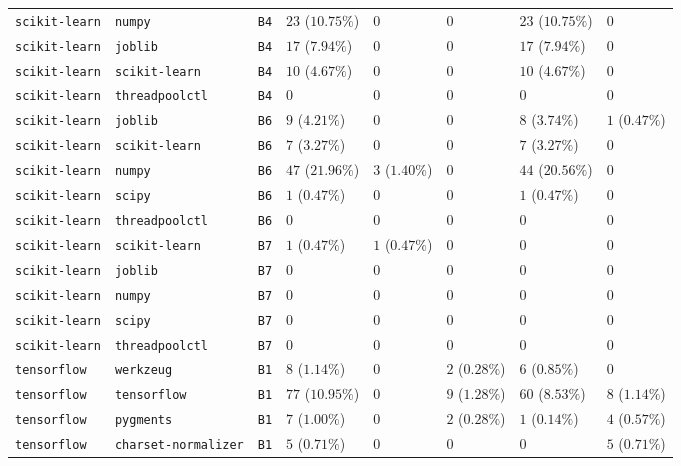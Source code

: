 \begin{table}
\begin{tabular}{llllllll}
\texttt{scikit-learn} & \texttt{numpy} & \texttt{B4} & $23$ ($10.75\%$) & $0$ & $0$ & $23$ ($10.75\%$) & $0$ \\
\texttt{scikit-learn} & \texttt{joblib} & \texttt{B4} & $17$ ($7.94\%$) & $0$ & $0$ & $17$ ($7.94\%$) & $0$ \\
\texttt{scikit-learn} & \texttt{scikit-learn} & \texttt{B4} & $10$ ($4.67\%$) & $0$ & $0$ & $10$ ($4.67\%$) & $0$ \\
\texttt{scikit-learn} & \texttt{threadpoolctl} & \texttt{B4} & $0$ & $0$ & $0$ & $0$ & $0$ \\
\texttt{scikit-learn} & \texttt{joblib} & \texttt{B6} & $9$ ($4.21\%$) & $0$ & $0$ & $8$ ($3.74\%$) & $1$ ($0.47\%$) \\
\texttt{scikit-learn} & \texttt{scikit-learn} & \texttt{B6} & $7$ ($3.27\%$) & $0$ & $0$ & $7$ ($3.27\%$) & $0$ \\
\texttt{scikit-learn} & \texttt{numpy} & \texttt{B6} & $47$ ($21.96\%$) & $3$ ($1.40\%$) & $0$ & $44$ ($20.56\%$) & $0$ \\
\texttt{scikit-learn} & \texttt{scipy} & \texttt{B6} & $1$ ($0.47\%$) & $0$ & $0$ & $1$ ($0.47\%$) & $0$ \\
\texttt{scikit-learn} & \texttt{threadpoolctl} & \texttt{B6} & $0$ & $0$ & $0$ & $0$ & $0$ \\
\texttt{scikit-learn} & \texttt{scikit-learn} & \texttt{B7} & $1$ ($0.47\%$) & $1$ ($0.47\%$) & $0$ & $0$ & $0$ \\
\texttt{scikit-learn} & \texttt{joblib} & \texttt{B7} & $0$ & $0$ & $0$ & $0$ & $0$ \\
\texttt{scikit-learn} & \texttt{numpy} & \texttt{B7} & $0$ & $0$ & $0$ & $0$ & $0$ \\
\texttt{scikit-learn} & \texttt{scipy} & \texttt{B7} & $0$ & $0$ & $0$ & $0$ & $0$ \\
\texttt{scikit-learn} & \texttt{threadpoolctl} & \texttt{B7} & $0$ & $0$ & $0$ & $0$ & $0$ \\
\texttt{tensorflow} & \texttt{werkzeug} & \texttt{B1} & $8$ ($1.14\%$) & $0$ & $2$ ($0.28\%$) & $6$ ($0.85\%$) & $0$ \\
\texttt{tensorflow} & \texttt{tensorflow} & \texttt{B1} & $77$ ($10.95\%$) & $0$ & $9$ ($1.28\%$) & $60$ ($8.53\%$) & $8$ ($1.14\%$) \\
\texttt{tensorflow} & \texttt{pygments} & \texttt{B1} & $7$ ($1.00\%$) & $0$ & $2$ ($0.28\%$) & $1$ ($0.14\%$) & $4$ ($0.57\%$) \\
\texttt{tensorflow} & \texttt{charset-normalizer} & \texttt{B1} & $5$ ($0.71\%$) & $0$ & $0$ & $0$ & $5$ ($0.71\%$) \\

\end{tabular}
\end{table}
